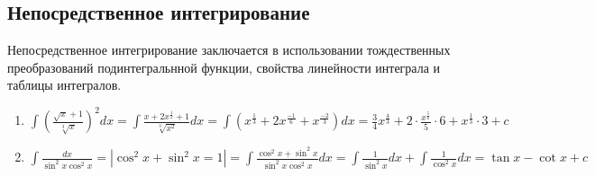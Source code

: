 \documentclass[a4paper,12pt]{bookest}
\theoremstyle{remark}
\begin{document}
\subsection{Непосредственное интегрирование}
Непосредственное интегрирование заключается в использовании тождественных преобразований подинтегральнной функции, свойства линейности интеграла и таблицы интегралов.\\
\begin{example}
\begin{enumerate}
	\item $\int(\frac{\sqrt{x}+1}{\sqrt[3]{x}})^2dx=\int\frac{x+2x^{\frac{1}{2}}+1}{\sqrt[3]{x^2}}dx=\int(x^{\frac{1}{3}}+2x^{\frac{-1}{6}}+x^{\frac{-2}{3}})dx=\frac{3}{4}x^{\frac{4}{3}}+2\cdot\frac{x^{\frac{5}{6}}}{5}\cdot 6+x^{\frac{1}{3}}\cdot 3+c$
	\item $\int\frac{dx}{\sin^2x\cos^2x}=|\cos^2x+\sin^2x=1|=\int\frac{\cos^2x+\sin^2x}{\sin^2x\cos^2x}dx=\int\frac{1}{\sin^2x}dx+\int\frac{1}{\cos^2x}dx=\tan x-\cot x+c$
\end{enumerate}
\end{example}
\end{document}
